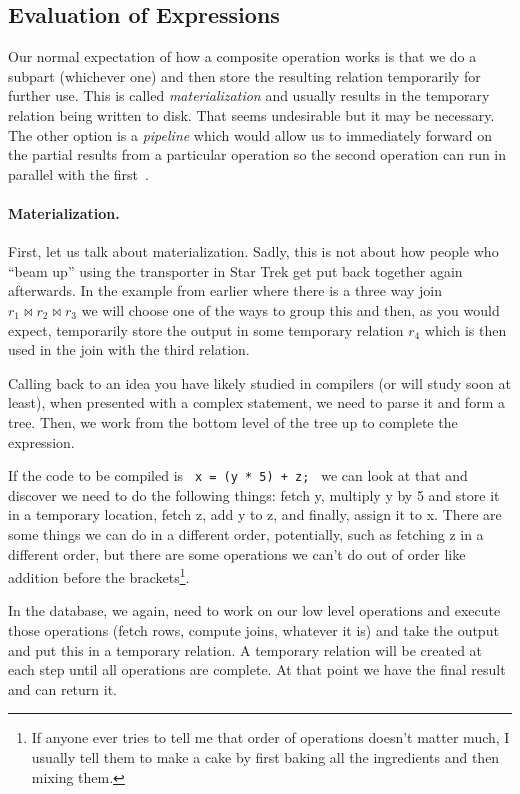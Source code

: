 \documentclass[a4paper]{report}
\begin{document}
\subsection*{Evaluation of Expressions}

Our normal expectation of how a composite operation works is that we do a subpart (whichever one) and then store the resulting relation temporarily for further use. This is called \textit{materialization} and usually results in the temporary relation being written to disk. That seems undesirable but it may be necessary. The other option is a \textit{pipeline} which would allow us to immediately forward on the partial results from a particular operation so the second operation can run in parallel with the first~\cite{dsc}.

\paragraph{Materialization.} First, let us talk about materialization. Sadly, this is not about how people who ``beam up'' using the transporter in Star Trek get put back together again afterwards. In the example from earlier where there is a three way join $r_{1} \bowtie r_{2} \bowtie r_{3}$ we will choose one of the ways to group this and then, as you would expect, temporarily store the output in some temporary relation $r_{4}$ which is then used in the join with the third relation. 

Calling back to an idea you have likely studied in compilers (or will study soon at least), when presented with a complex statement, we need to parse it and form a tree. Then, we work from the bottom level of the tree up to complete the expression. 

If the code to be compiled is \texttt{ x = (y * 5) + z; } we can look at that and discover we need to do the following things: fetch y, multiply y by 5 and store it in a temporary location, fetch z, add y to z, and finally, assign it to x. There are some things we can do in a different order, potentially, such as fetching z in a different order, but there are some operations we can't do out of order like addition before the brackets\footnote{If anyone ever tries to tell me that order of operations doesn't matter much, I usually tell them to make a cake by first baking all the ingredients and then mixing them.}. 

In the database, we again, need to work on our low level operations and execute those operations (fetch rows, compute joins, whatever it is) and take the output and put this in a temporary relation. A temporary relation will be created at each step until all operations are complete. At that point we have the final result and can return it. 
\end{document}
